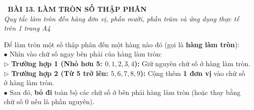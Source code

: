 \documentclass[14pt,a4paper,oneside]{extbook}
\begin{document}
\noindent
\begin{tcolorbox}[
  enhanced,
  colback=teal!8!white,
  colframe=teal!80!black,
  arc=3mm,
  boxrule=1.1pt,
  width=\linewidth,
  halign=center,
  top=2.2mm, bottom=2.2mm,
  left=3mm, right=3mm,
  drop fuzzy shadow
]
  {\large\bfseries\color{teal!95!black}\faBookmark\ BÀI 13. LÀM TRÒN SỐ THẬP PHÂN}\\[2pt]
  {\scriptsize\color{black!75}\itshape Quy tắc làm tròn đến hàng đơn vị, phần mười, phần trăm và ứng dụng thực tế trên 1 trang A4}
\end{tcolorbox}

\vspace{3.2mm}
\noindent
\begin{tcolorbox}[
  enhanced,
  title={\footnotesize\bfseries\color{white}\faKey\ 1. Quy tắc làm tròn số thập phân},
  colback=blue!2!white,
  colframe=blue!75!black,
  arc=2.5mm, boxrule=0.8pt, top=1.8mm, bottom=1.8mm, left=2.5mm, right=2.5mm
]
  \footnotesize
  Để làm tròn một số thập phân đến một hàng nào đó (gọi là \textbf{hàng làm tròn}):\\
  $\bullet$ Nhìn vào chữ số ngay bên phải của hàng làm tròn:\\
  $\triangleright$ \textbf{Trường hợp 1 (Nhỏ hơn 5: $0, 1, 2, 3, 4$):} Giữ nguyên chữ số ở hàng làm tròn.\\
  $\triangleright$ \textbf{Trường hợp 2 (Từ 5 trở lên: $5, 6, 7, 8, 9$):} Cộng thêm \textbf{1 đơn vị} vào chữ số ở hàng làm tròn.\\
  $\bullet$ Sau đó, \textbf{bỏ đi} toàn bộ các chữ số ở bên phải hàng làm tròn (hoặc thay bằng chữ số $0$ nếu là phần nguyên).
\end{tcolorbox}

\vspace{3mm}
\end{document}
